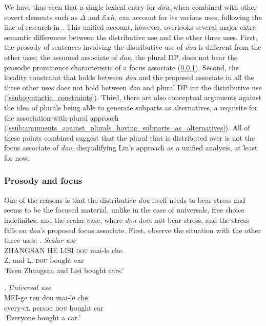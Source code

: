 \documentclass[12pt]{article}
\newcommand{\Exh}{\ensuremath{\mathcal{E}\mathit{xh}}}
\begin{document}
We have thus seen that a single lexical entry for \emph{dou}, when combined with other covert elements such as \(\Delta\) and {\Exh}, can account for its various uses, following the line of research in \citet{liuVarietiesAlternativesMandarin2017,liuPragmaticExplanationMeidou2021}.
This unified account, however, overlooks several major extra-semantic differences between the distributive use and the other three uses.
First, the prosody of sentences involving the distributive use of \emph{dou} is different from the other uses; the assumed associate of \emph{dou}, the plural DP, does not bear the prosodic prominence characteristic of a focus associate (\cref{sub:prosody_and_focus}).
Second, the locality constraint that holds between \emph{dou} and the proposed associate in all the three other uses does not hold between \emph{dou} and plural DP int the distributive use (\cref{ssub:syntactic_constraints}).
Third, there are also conceptual arguments against the idea of plurals being able to generate subparts as alternatives, a requisite for the association-with-plural approach (\cref{ssub:arguments_against_plurals_having_subparts_as_alternatives}).
All of these points combined suggest that the plural that is distributed over is not the focus associate of \emph{dou}, disqualifying Liu's approach as a unified analysis, at least for now.



\subsubsection{Prosody and focus}
\label{sub:prosody_and_focus}



One of the reasons is that the distributive \emph{dou} itself needs to bear stress and seems to be the focused material, unlike in the case of universals, free choice indefinites, and the scalar case, where \emph{dou} does not bear stress, and the stress falls on \emph{dou}'s proposed focus associate.
First, observe the situation with the other three uses:
\ex. \emph{Scalar use}\\
\gll
ZHANGSAN HE LISI \textsc{dou} mai-le che.   \\
Z. and L. \textsc{dou} bought car \\
\glt `Even Zhangsan and Lisi bought cars.' \label{itm:scal_stress}

\ex. \emph{Universal use}\\
\gll
MEI-ge ren dou mai-le che. \\
every-\textsc{cl} person \textsc{dou} bought car \\
\glt `Everyone bought a car.'
\end{document}
